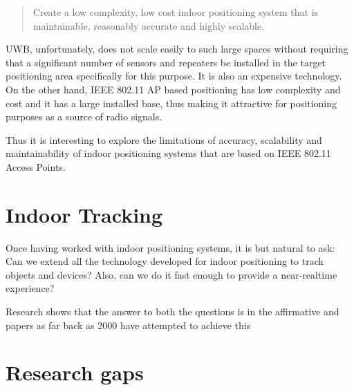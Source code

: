 \begin{quote}
Create a low complexity, low cost indoor positioning system that is
maintainable, reasonably accurate and highly scalable.
\end{quote}

UWB, unfortunately, does not scale easily to such large spaces without requiring
that a significant number of sensors and repeaters be installed in the target
positioning area specifically for this purpose. It is also an expensive
technology. On the other hand, IEEE 802.11 AP based positioning has low
complexity and cost and it has a large installed base, thus making it attractive
for positioning purposes as a source of radio signals.

Thus it is interesting to explore the limitations of accuracy, scalability and
maintainability of indoor positioning systems that are based on IEEE 802.11
Access Points.


\section{Indoor Tracking}

Once having worked with indoor positioning systems, it is but natural to ask:
Can we extend all the technology developed for indoor positioning to track 
objects and devices? Also, can we do it fast enough to provide a near-realtime
experience?

Research shows that the answer to both the questions is in the affirmative
and papers as far back as 2000 \cite{RADAR} have attempted to achieve this 


\section{Research gaps}

